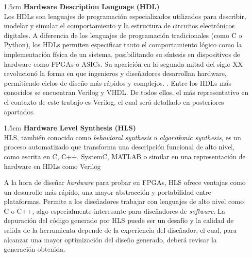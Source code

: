 \vspace{0.4em} %

\begin{adjustwidth}{1.5cm}{}
\textbf{Hardware Description Language (HDL)} \vspace{0.25cm} \\
Los \ac{HDL}s son lenguajes de programación especializados utilizados para describir, modelar y simular el comportamiento y la estructura de circuitos electrónicos digitales. A diferencia de los lenguajes de programación tradicionales (como C o Python), los HDLs permiten especificar tanto el comportamiento lógico como la implementación física de un sistema, posibilitando su síntesis en dispositivos de hardware como FPGAs o ASICs. Su aparición en la segunda mitad del siglo XX revolucionó la forma en que ingenieros y diseñadores desarrollan hardware, permitiendo ciclos de diseño más rápidos y complejos. \cite{infoHDL}. Entre los HDLs más conocidos se encuentran Verilog y \acf{VHDL}. De todos ellos, el más representativo en el contexto de este trabajo es Verilog, el cual será detallado en posteriores apartados.
\end{adjustwidth}


\vspace{0.4em} %

\begin{adjustwidth}{1.5cm}{}
\textbf{Hardware Level Synthesis (HLS)} \vspace{0.25cm} \\
\ac{HLS}, también conocido como \emph{behavioral synthesis} o \textit{algorithmic synthesis}, es un proceso automatizado que transforma una descripción funcional de alto nivel, como escrita en C, C++, SystemC, MATLAB o similar en una representación de hardware en HDLs como Verilog \cite{infoHLS}

A la hora de diseñar \textit{hardware} para probar en FPGAs, HLS ofrece ventajas como un desarrollo más rápido, una mayor abstracción y portabilidad entre plataformas. Permite a los diseñadores trabajar con lenguajes de alto nivel como C o C++, algo especialmente interesante para diseñadores de \textit{software}. La depuración del código generado por HLS puede ser un desafío y la calidad de salida de la herramienta depende de la experiencia del diseñador, el cual, para alcanzar una mayor optimización del diseño generado, deberá revisar la generación obtenida. \cite{ventajasHLS}
\end{adjustwidth}

